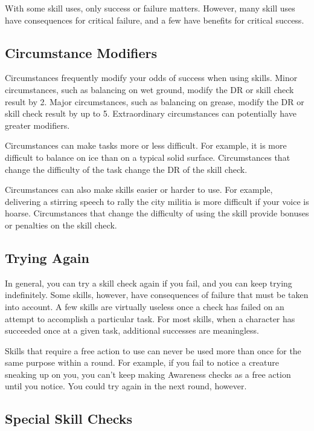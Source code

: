         With some skill uses, only success or failure matters.
        However, many skill uses have consequences for critical failure, and a few have benefits for critical success.

    \subsection{Circumstance Modifiers}

        Circumstances frequently modify your odds of success when using skills.
        Minor circumstances, such as balancing on wet ground, modify the DR or skill check result by 2.
        Major circumstances, such as balancing on grease, modify the DR or skill check result by up to 5.
        Extraordinary circumstances can potentially have greater modifiers.

         Circumstances can make tasks more or less difficult. For example, it is more difficult to balance on ice than on a typical solid surface. Circumstances that change the difficulty of the task change the DR of the skill check.

         Circumstances can also make skills easier or harder to use. For example, delivering a stirring speech to rally the city militia is more difficult if your voice is hoarse. Circumstances that change the difficulty of using the skill provide bonuses or penalties on the skill check.

    \subsection{Trying Again}
        In general, you can try a skill check again if you fail, and you can keep trying indefinitely. Some skills, however, have consequences of failure that must be taken into account. A few skills are virtually useless once a check has failed on an attempt to accomplish a particular task. For most skills, when a character has succeeded once at a given task, additional successes are meaningless.

        Skills that require a free action to use can never be used more than once for the same purpose within a round. For example, if you fail to notice a creature sneaking up on you, you can't keep making Awareness checks as a free action until you notice. You could try again in the next round, however.

    \subsection{Special Skill Checks}

